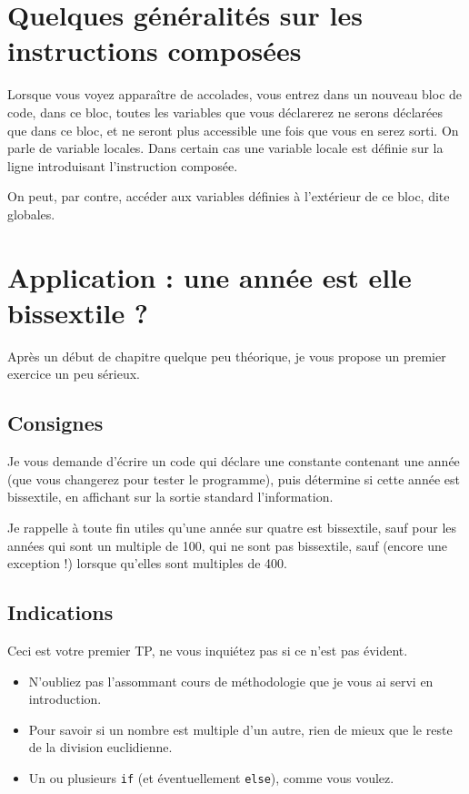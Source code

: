 \section{Quelques généralités sur les instructions composées}
Lorsque vous voyez apparaître de accolades, vous entrez dans un nouveau bloc de code, dans ce bloc, toutes les variables que vous déclarerez ne serons déclarées que dans ce bloc, et ne seront plus accessible une fois que vous en serez sorti. On parle de variable locales. Dans certain cas une variable locale est définie sur la ligne introduisant l'instruction composée.

On peut, par contre, accéder aux variables définies à l'extérieur de ce bloc, dite globales.
\section{Application : une année est elle bissextile ?}
Après un début de chapitre quelque peu théorique, je vous propose un premier exercice un peu sérieux.
\subsection{Consignes}
Je vous demande d'écrire un code qui déclare une constante contenant une année
(que vous changerez pour tester le programme),
puis détermine si cette année est bissextile,
en affichant sur la sortie standard l'information.

Je rappelle à toute fin utiles qu'une année sur quatre est bissextile,
sauf pour les années qui sont un multiple de 100, qui ne sont pas bissextile,
sauf (encore une exception !) lorsque qu'elles sont multiples de 400.
\subsection{Indications}

Ceci est votre premier TP, ne vous inquiétez pas si ce n'est pas évident.

\begin{itemize}

\item N'oubliez pas l'assommant cours de méthodologie que je vous ai servi en introduction.

\item Pour savoir si un nombre est multiple d'un autre,
rien de mieux que le reste de la division euclidienne.

\item Un ou plusieurs \texttt{if} (et éventuellement \texttt{else}), comme vous voulez.
\end{itemize}
\pagebreak %
